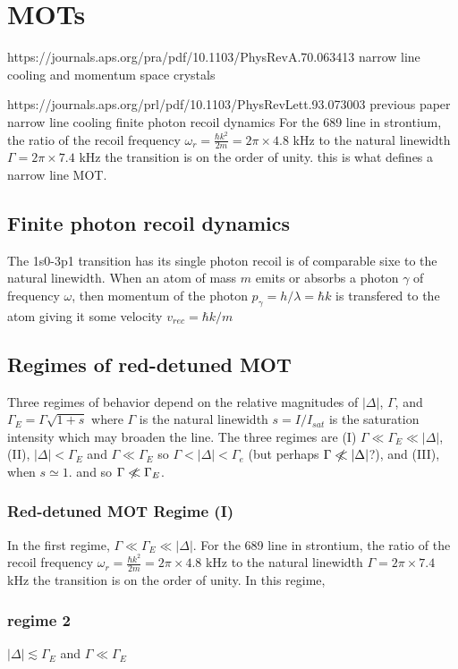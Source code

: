 \documentclass[../../main.tex]{subfiles} %
\begin{document}
\chapter{MOTs}

https://journals.aps.org/pra/pdf/10.1103/PhysRevA.70.063413 narrow line cooling and momentum space crystals

https://journals.aps.org/prl/pdf/10.1103/PhysRevLett.93.073003 previous paper narrow line cooling finite photon recoil dynamics
For the 689 line in strontium, the ratio of the recoil frequency $\omega_r=\frac{\hbar k^2}{2m}=2\pi\times 4.8$ kHz to the natural linewidth $\Gamma=2\pi\times 7.4$ kHz the transition is on the order of unity. this is what defines a narrow line MOT.
\section{Finite photon recoil dynamics}
The 1s0-3p1 transition has its single photon recoil is of comparable sixe to the natural linewidth. When an atom of mass $m$ emits or absorbs a photon $\gamma$ of frequency $\omega$, then momentum of the photon $p_\gamma=h/\lambda=\hbar k$ is transfered to the atom giving it some velocity $v_{rec}=\hbar k/m$



\section{Regimes of red-detuned MOT}
Three regimes of behavior depend on the relative magnitudes of $|\Delta|$, $\Gamma$, and $\Gamma_E=\Gamma\sqrt{1+s}$ where $\Gamma$ is the natural linewidth $s=I/I_{sat}$ is the saturation intensity which may broaden the line. The three regimes are (I) $\Gamma\ll\Gamma_E\ll |\Delta|$, (II), $|\Delta|<\Gamma_E$ and $\Gamma\ll\Gamma_E$ so $\Gamma<|\Delta|<\Gamma_e$ (but perhaps $\Gamma\centernot\ll |\Delta|$?), and (III), when $s\simeq 1$. and so $\Gamma\centernot\ll \Gamma_E$. 

\subsection{Red-detuned MOT Regime (I)}
In the first regime, $\Gamma\ll\Gamma_E\ll |\Delta|$. For the 689 line in strontium, the ratio of the recoil frequency $\omega_r=\frac{\hbar k^2}{2m}=2\pi\times 4.8$ kHz to the natural linewidth $\Gamma=2\pi\times 7.4$ kHz the transition is on the order of unity. In this regime, 

\subsection{regime 2 }
$|\Delta| \lesssim \Gamma_E$ and $\Gamma\ll\Gamma_E$ 
\end{document}

